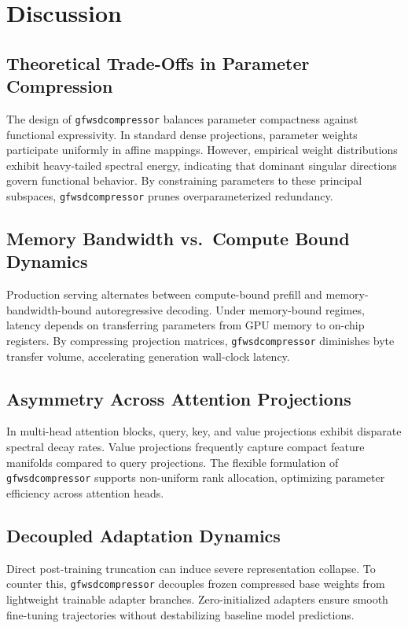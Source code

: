 \section{Discussion}

\subsection{Theoretical Trade-Offs in Parameter Compression}
The design of \texttt{gfwsdcompressor} balances parameter compactness against functional expressivity. In standard dense projections, parameter weights participate uniformly in affine mappings. However, empirical weight distributions exhibit heavy-tailed spectral energy, indicating that dominant singular directions govern functional behavior. By constraining parameters to these principal subspaces, \texttt{gfwsdcompressor} prunes overparameterized redundancy.

\subsection{Memory Bandwidth vs.\ Compute Bound Dynamics}
Production serving alternates between compute-bound prefill and memory-bandwidth-bound autoregressive decoding. Under memory-bound regimes, latency depends on transferring parameters from GPU memory to on-chip registers. By compressing projection matrices, \texttt{gfwsdcompressor} diminishes byte transfer volume, accelerating generation wall-clock latency.

\subsection{Asymmetry Across Attention Projections}
In multi-head attention blocks, query, key, and value projections exhibit disparate spectral decay rates. Value projections frequently capture compact feature manifolds compared to query projections. The flexible formulation of \texttt{gfwsdcompressor} supports non-uniform rank allocation, optimizing parameter efficiency across attention heads.

\subsection{Decoupled Adaptation Dynamics}
Direct post-training truncation can induce severe representation collapse. To counter this, \texttt{gfwsdcompressor} decouples frozen compressed base weights from lightweight trainable adapter branches. Zero-initialized adapters ensure smooth fine-tuning trajectories without destabilizing baseline model predictions.


